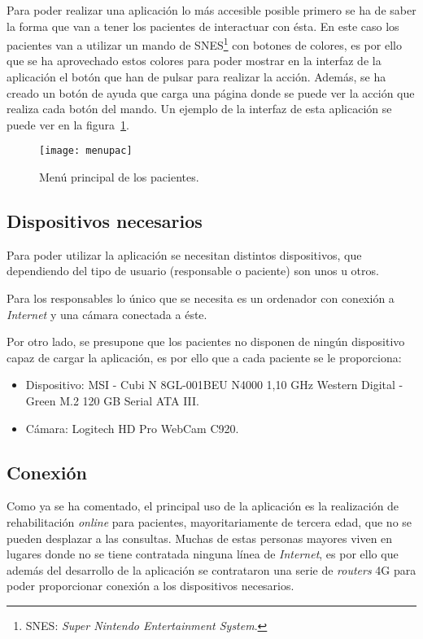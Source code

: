 {Para poder realizar una aplicación lo más accesible posible primero se ha de saber la forma que van a tener los pacientes de interactuar con ésta. En este caso los pacientes van a utilizar un mando de SNES\footnote{SNES: \textit{Super Nintendo Entertainment System}.} con botones de colores, es por ello que se ha aprovechado estos colores para poder mostrar en la interfaz de la aplicación el botón que han de pulsar para realizar la acción. Además, se ha creado un botón de ayuda que carga una página donde se puede ver la acción que realiza cada botón del mando. Un ejemplo de la interfaz de esta aplicación se puede ver en la figura~\ref{fig:menupaciente}.

\begin{figure}[h]
	\centering
	\texttt{[image: menupac]}
	\caption{Menú principal de los pacientes.}
	\label{fig:menupaciente}
\end{figure}

\subsection{Dispositivos necesarios}
Para poder utilizar la aplicación se necesitan distintos dispositivos, que dependiendo del tipo de usuario (responsable o paciente) son unos u otros.

Para los responsables lo único que se necesita es un ordenador con conexión a \textit{Internet} y una cámara conectada a éste.

Por otro lado, se presupone que los pacientes no disponen de ningún dispositivo capaz de cargar la aplicación, es por ello que a cada paciente se le proporciona:
\begin{itemize}
	\item Dispositivo: MSI - Cubi N 8GL-001BEU N4000 1,10 GHz Western Digital - Green M.2 120 GB Serial ATA III.
	\item Cámara: Logitech HD Pro WebCam C920.
\end{itemize}

\subsection{Conexión}
Como ya se ha comentado, el principal uso de la aplicación es la realización de rehabilitación \textit{online} para pacientes, mayoritariamente de tercera edad, que no se pueden desplazar a las consultas. Muchas de estas personas mayores viven en lugares donde no se tiene contratada ninguna línea de \textit{Internet}, es por ello que además del desarrollo de la aplicación se contrataron una serie de \textit{routers} 4G para poder proporcionar conexión a los dispositivos necesarios. 

}
